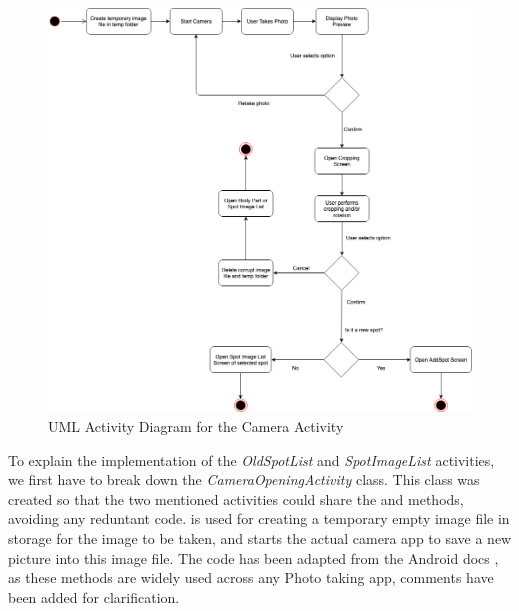 \begin{figure}
    \includegraphics[width=1.2\textwidth, center]{figures/CameraScreen.png}
    \caption{UML Activity Diagram for the Camera Activity}
    \label{fig:CameraScreen}
\end{figure}
To explain the implementation of the \emph{OldSpotList} and \emph{SpotImageList} activities, we first have to break down the \emph{CameraOpeningActivity} class. This class was created so that the two mentioned activities could share the  and  methods, avoiding any reduntant code.  is used for creating a temporary empty image file in storage for the image to be taken, and  starts the actual camera app to save a new picture into this image file. The code has been adapted from the Android docs \cite{androiddevelopers3}, as these methods are widely used across any Photo taking app, comments have been added for clarification.

